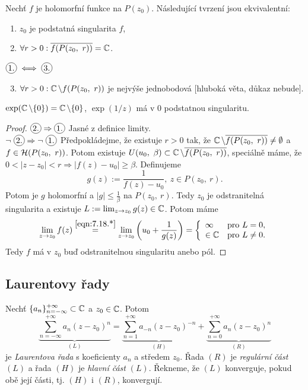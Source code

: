 \newpage
\begin{theorem} Nechť $f$ je holomorfní funkce na $P(z_0)$. Následující tvrzení jsou ekvivalentní:
\begin{enumerate}
    \item $z_0$ je podstatná singularita $f$,
    \item $\forall r>0: \overline{f(P(z_0,\ r))}=\Comp$.
\end{enumerate}
\end{theorem}
\begin{note} $\circled{1.}\iff\circled{3.}$
\begin{enumerate}
\setcounter{enumi}{2}
    \item $\forall r>0:\operatorname{\mathbb{C}}\setminus f(P(z_0,\ r))$ je nejvýše jednobodová [hluboká věta, důkaz nebude].
\end{enumerate}

\begin{example}
$\exp(\operatorname{\mathbb{C}}\setminus\{0\})=\operatorname{\mathbb{C}}\setminus\{0\}$, $\exp(1/z)$ má v 0 podstatnou singularitu.
\end{example}
\end{note}
\begin{proof}
$\circled{2.}\Rightarrow\circled{1.}$ Jasné z definice limity.\\
$\neg\ \circled{2.}\Rightarrow\neg\ \circled{1.}$ Předpokládejme, že existuje $r>0$ tak, že $\Comp\setminus\overline{f(P(z_0,\ r))}\neq\emptyset$ a $f\in\Holo(P(z_0,\ r))$. Potom existuje $U(u_0,\ \beta)\subset\Comp\setminus\overline{f(P(z_0,\ r))}$, speciálně máme, že $0<|z-z_0|<r\Rightarrow|f(z)-u_0|\geq\beta$. 
Definujeme 
\begin{equation*} 
    \tag{*}
    \label{eqn:7.18.*}
    g(z):=\frac{1}{f(z)-u_0},\ z\in P(z_0,\ r)\text{.}
\end{equation*} 
Potom je $g$ holomorfní a $|g|\leq\frac{1}{\beta}$ na $P(z_0,\ r)$. Tedy $z_0$ je odstranitelná singularita a existuje $L:=\lim_{z\rightarrow z_0}g(z)\in\operatorname{\mathbb{C}}$. Potom máme 
$$\lim_{z\rightarrow z_0}f(z)\stackrel{\cref{eqn:7.18.*}}{=}\lim_{z\rightarrow z_0}\left(u_0+\frac{1}{g(z)}\right)=\twopartdef{\infty}{L=0,}{\in\Comp}{L\neq0.}$$
Tedy $f$ má v $z_0$ buď odstranitelnou singularitu anebo pól.
\end{proof}
\subsection{Laurentovy řady}
\begin{definition}
Nechť $\{a_n\}_{n=-\infty}^{+\infty}\subset\operatorname{\mathbb{C}}$ a $z_0\in\operatorname{\mathbb{C}}$. Potom 
\begin{equation}
    \underbrace{\sum_{n=-\infty}^{+\infty}a_n(z-z_0)^n}_{(L)}= \underbrace{\sum_{n=1}^{+\infty}a_{-n}(z-z_0)^{-n}}_{(H)} + \underbrace{\sum_{n=0}^{+\infty}a_n(z-z_0)^n}_{(R)}
\end{equation}
je \emph{Laurentova řada} s koeficienty ${a_n}$ a středem $z_0$. Řada $(R)$ je \emph{regulární část} $(L)$ a řada $(H)$ je \emph{hlavní část} $(L)$. Řekneme, že $(L)$ konverguje, pokud obě její části, tj. $(H)$ i $(R)$, konvergují.
\end{definition}

